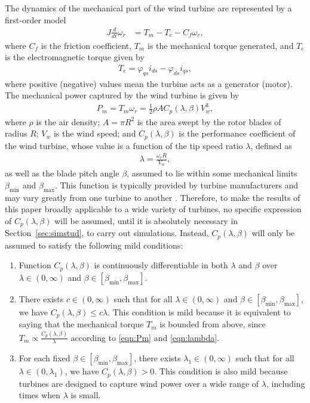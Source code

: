 \documentclass[journal]{IEEEtran}
\begin{document}
The dynamics of the mechanical part of the wind turbine are represented by a first-order model
\begin{align}
J\frac{d}{dt}\omega_r&=T_m-T_e-C_f\omega_r\label{eqn:mech},
\end{align}
where $C_f$ is the friction coefficient, $T_m$ is the mechanical torque generated, and $T_e$ is the electromagnetic torque given by \cite{LeiYZ06}
\begin{align}
T_e=\varphi_{qs}i_{ds}-\varphi_{ds}i_{qs}\label{eqn:Te},
\end{align}
where positive (negative) values mean the turbine acts as a generator (motor). The mechanical power captured by the wind turbine is given by\cite{Bianchi07}
\begin{align}
P_m=T_m\omega_r=\frac{1}{2}\rho AC_p(\lambda,\beta)V_{w}^3,\label{eqn:Pm}
\end{align}
where $\rho$ is the air density; $A=\pi R^2$ is the area swept by the rotor blades of radius $R$; $V_{w}$ is the wind speed; and $C_p(\lambda,\beta)$ is the performance coefficient of the wind turbine, whose value is a function \cite{Bianchi07} of the tip speed ratio $\lambda$, defined as
\begin{align}
\lambda =\frac{\omega_rR}{V_{w}},\label{eqn:lambda}
\end{align}
as well as the blade pitch angle $\beta$, assumed to lie within some mechanical limits $\beta_{\min}$ and $\beta_{\max}$. This function is typically provided by turbine manufacturers and may vary greatly from one turbine to another \cite{Bianchi07}. Therefore, to make the results of this paper broadly applicable to a wide variety of turbines, no specific expression of $C_p(\lambda,\beta)$ will be assumed, until it is absolutely necessary in Section~\ref{sec:simstud}, to carry out simulations. Instead, $C_p(\lambda,\beta)$ will only be assumed to satisfy the following mild conditions:
\begin{enumerate}
\itemsep-\parsep

\item Function $C_p(\lambda,\beta)$ is continuously differentiable in both $\lambda$ and $\beta$ over $\lambda\in(0, \infty)$ and $\beta\in[\beta_{\min}, \beta_{\max}]$.
\item There exists $c\in(0, \infty)$ such that for all $\lambda\in(0, \infty)$ and $\beta \in [\beta_{\min}, \beta_{\max}]$, we have $C_p(\lambda,\beta)\leq c\lambda$. This condition is mild because it is equivalent to saying that the mechanical torque $T_m$ is bounded from above, since $T_m\propto\frac{C_p(\lambda,\beta)}{\lambda}$ according to \eqref{eqn:Pm} and \eqref{eqn:lambda}.
\item For each fixed $\beta\in[\beta_{\min}, \beta_{\max}]$, there exists $\lambda_1\in(0, \infty)$ such that for all $\lambda\in(0, \lambda_1)$, we have $C_p(\lambda, \beta)>0$. This condition is also mild because turbines are designed to capture wind power over a wide range of $\lambda$, including times when $\lambda$ is small.
\end{enumerate}
\end{document}
